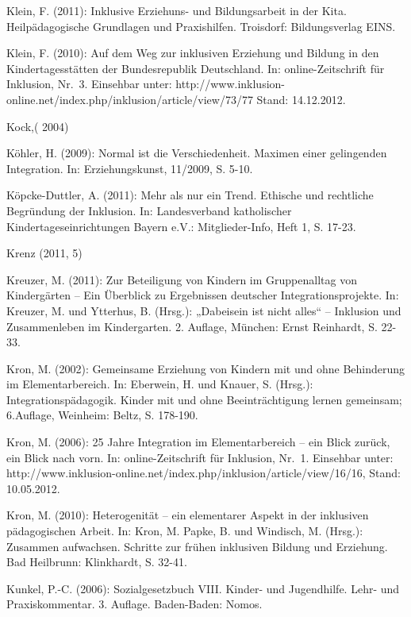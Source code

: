 Klein, F. (2011): Inklusive Erziehuns- und Bildungsarbeit in der Kita. Heilpädagogische Grundlagen und Praxishilfen. Troisdorf: Bildungsverlag EINS.

Klein, F. (2010): Auf dem Weg zur inklusiven Erziehung und Bildung in den Kindertagesstätten der Bundesrepublik Deutschland. In: online-Zeitschrift für Inklusion, Nr.~3. Einsehbar unter: http://www.inklusion-online.net/index.php/inklusion/article/view/73/77 Stand: 14.12.2012.  


Kock,( 2004)

Köhler, H. (2009): Normal ist die Verschiedenheit. Maximen einer gelingenden Integration. In: Erziehungskunst, 11/2009, S. 5-10.

Köpcke-Duttler, A. (2011): Mehr als nur ein Trend. Ethische und rechtliche Begründung der Inklusion. In: Landesverband katholischer Kindertageseinrichtungen Bayern e.V.: Mitglieder-Info, Heft 1, S. 17-23.

Krenz (2011, 5)

Kreuzer, M. (2011): Zur Beteiligung von Kindern im Gruppenalltag von Kindergärten – Ein Überblick zu Ergebnissen deutscher Integrationsprojekte. In: Kreuzer, M. und Ytterhus, B. (Hrsg.): „Dabeisein ist nicht alles“ – Inklusion und Zusammenleben im Kindergarten. 2. Auflage, München: Ernst Reinhardt, S. 22-33.

Kron, M. (2002): Gemeinsame Erziehung von Kindern mit und ohne Behinderung im Elementarbereich. In: Eberwein, H. und Knauer, S. (Hrsg.): Integrationspädagogik. Kinder mit und ohne Beeinträchtigung lernen gemeinsam; 6.Auflage, Weinheim: Beltz, S. 178-190. 

Kron, M. (2006): 25 Jahre Integration im Elementarbereich – ein Blick zurück, ein Blick nach vorn. In: online-Zeitschrift für Inklusion, Nr.~1. Einsehbar unter: http://www.inklusion-online.net/index.php/inklusion/article/view/16/16, Stand: 10.05.2012.

Kron, M. (2010): Heterogenität – ein elementarer Aspekt in der inklusiven pädagogischen Arbeit. In: Kron, M. Papke, B. und Windisch, M. (Hrsg.): Zusammen aufwachsen. Schritte zur frühen inklusiven Bildung und Erziehung. Bad Heilbrunn: Klinkhardt, S. 32-41.

Kunkel, P.-C. (2006): Sozialgesetzbuch VIII. Kinder- und Jugendhilfe. Lehr- und Praxiskommentar. 3. Auflage. Baden-Baden: Nomos. 

